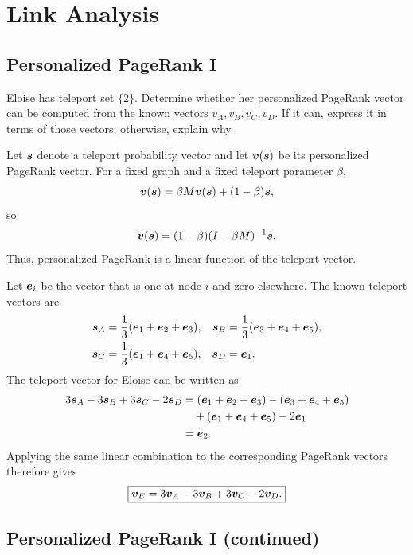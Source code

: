 \section{Link Analysis}

\subsection{Personalized PageRank I}

Eloise has teleport set $\{2\}$. Determine whether her personalized PageRank
vector can be computed from the known vectors $v_A,v_B,v_C,v_D$. If it can,
express it in terms of those vectors; otherwise, explain why.

\begin{solution}
Let $\bm{s}$ denote a teleport probability vector and let
$\bm{v}(\bm{s})$ be its personalized PageRank vector. For a fixed graph
and a fixed teleport parameter $\beta$,
\[
  \bm{v}(\bm{s})
  = \beta M\bm{v}(\bm{s})+(1-\beta)\bm{s},
\]
so
\[
  \bm{v}(\bm{s})
  = (1-\beta)(I-\beta M)^{-1}\bm{s}.
\]
Thus, personalized PageRank is a linear function of the teleport vector.

Let $\bm{e}_i$ be the vector that is one at node $i$ and zero elsewhere.
The known teleport vectors are
\begin{align*}
  \bm{s}_A &= \frac{1}{3}(\bm{e}_1+\bm{e}_2+\bm{e}_3),&
  \bm{s}_B &= \frac{1}{3}(\bm{e}_3+\bm{e}_4+\bm{e}_5),\\
  \bm{s}_C &= \frac{1}{3}(\bm{e}_1+\bm{e}_4+\bm{e}_5),&
  \bm{s}_D &= \bm{e}_1.
\end{align*}
The teleport vector for Eloise can be written as
\begin{align*}
  3\bm{s}_A-3\bm{s}_B+3\bm{s}_C-2\bm{s}_D
  &= (\bm{e}_1+\bm{e}_2+\bm{e}_3)
     -(\bm{e}_3+\bm{e}_4+\bm{e}_5)\\
  &\quad+(\bm{e}_1+\bm{e}_4+\bm{e}_5)-2\bm{e}_1\\
  &= \bm{e}_2.
\end{align*}
Applying the same linear combination to the corresponding PageRank vectors
therefore gives
\[
  \boxed{\bm{v}_{E}=3\bm{v}_A-3\bm{v}_B
  +3\bm{v}_C-2\bm{v}_D.}
\]
\end{solution}

\subsection{Personalized PageRank I (continued)}

